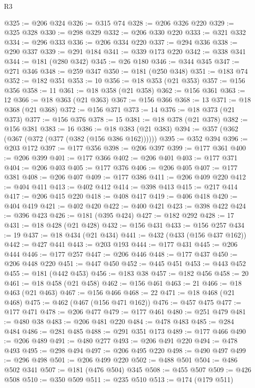 \begin{lexlean}{R3}
\begin{coremodule}
@325 := @206 @324
@326 := @315 @74
@328 := @206 @326 @220
@329 := @325 @328
@330 := @298 @329
@332 := @206 @330 @220
@333 := @321 @332
@334 := @296 @333
@336 := @206 @334 @220
@337 := @294 @336
@338 := @290 @337
@339 := @291 @184
@341 := @339 @173 @220
@342 := @338 @341
@344 := @181 (@280 @342)
@345 := @26 @180
@346 := @344 @345
@347 := @271 @346
@348 := @259 @347
@350 := @181 (@250 @348)
@351 := @183 @74
@352 := @182 @351
@353 := 10
@356 := @18 @353 (@21 @353)
@357 := @156 @356
@358 := 11
@361 := @18 @358 (@21 @358)
@362 := @156 @361
@363 := 12
@366 := @18 @363 (@21 @363)
@367 := @156 @366
@368 := 13
@371 := @18 @368 (@21 @368)
@372 := @156 @371
@373 := 14
@376 := @18 @373 (@21 @373)
@377 := @156 @376
@378 := 15
@381 := @18 @378 (@21 @378)
@382 := @156 @381
@383 := 16
@386 := @18 @383 (@21 @383)
@394 := @357 (@362 (@367 (@372 (@377 (@382 (@156 @386 @162))))))
@395 := @352 @394
@396 := @203 @172
@397 := @177 @356
@398 := @206 @397
@399 := @177 @361
@400 := @206 @399
@401 := @177 @366
@402 := @206 @401
@403 := @177 @371
@404 := @206 @403
@405 := @177 @376
@406 := @206 @405
@407 := @177 @381
@408 := @206 @407
@409 := @177 @386
@411 := @206 @409 @220
@412 := @404 @411
@413 := @402 @412
@414 := @398 @413
@415 := @217 @414
@417 := @206 @415 @220
@418 := @408 @417
@419 := @406 @418
@420 := @404 @419
@421 := @402 @420
@422 := @400 @421
@423 := @398 @422
@424 := @396 @423
@426 := @181 (@395 @424)
@427 := @182 @292
@428 := 17
@431 := @18 @428 (@21 @428)
@432 := @156 @431
@433 := @156 @257
@434 := 19
@437 := @18 @434 (@21 @434)
@441 := @432 (@433 (@156 @437 @162))
@442 := @427 @441
@443 := @203 @193
@444 := @177 @431
@445 := @206 @444
@446 := @177 @257
@447 := @206 @446
@448 := @177 @437
@450 := @206 @448 @220
@451 := @447 @450
@452 := @445 @451
@453 := @443 @452
@455 := @181 (@442 @453)
@456 := @183 @38
@457 := @182 @456
@458 := 20
@461 := @18 @458 (@21 @458)
@462 := @156 @461
@463 := 21
@466 := @18 @463 (@21 @463)
@467 := @156 @466
@468 := 22
@471 := @18 @468 (@21 @468)
@475 := @462 (@467 (@156 @471 @162))
@476 := @457 @475
@477 := @177 @471
@478 := @206 @477
@479 := @177 @461
@480 := @251 @479
@481 := @480 @38
@483 := @206 @481 @220
@484 := @478 @483
@485 := @284 @484
@486 := @281 @485
@488 := @291 @351 @173
@489 := @177 @466
@490 := @206 @489
@491 := @480 @277
@493 := @206 @491 @220
@494 := @478 @493
@495 := @298 @494
@497 := @206 @495 @220
@498 := @490 @497
@499 := @296 @498
@501 := @206 @499 @220
@502 := @488 @501
@504 := @486 @502 @341
@507 := @181 (@476 @504) @345
@508 := @455 @507
@509 := @426 @508
@510 := @350 @509
@511 := @235 @510
@513 := @174 (@179 @511)

\end{coremodule}
\end{lexlean}
